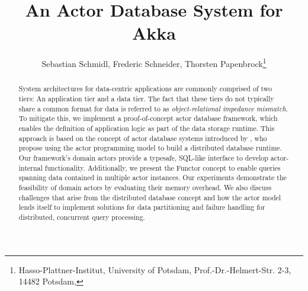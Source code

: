 \documentclass[english,utf8,biblatex]{lni-tex/lni}
\author[Frederic Schneider \and Sebastian Schmidl \and Thorsten Papenbrock]{%
Sebastian Schmidl, Frederic Schneider, Thorsten Papenbrock\footnote{Hasso-Plattner-Institut, University of Potsdam, Prof.-Dr.-Helmert-Str. 2-3, 14482 Potsdam, \email{{sebastian.schmidl,frederic.schneider,thorsten.papenbrock}@student.hpi.de}}
}
\title[An Actor Database System for Akka]{An Actor Database System for Akka}
\begin{document}
\maketitle

\setcounter{footnote}{1}

\begin{abstract}
  System architectures for data-centric applications are commonly comprised of two tiers:
  An application tier and a data tier.
  The fact that these tiers do not typically share a common format for data is referred to as \textit{object-relational impedance mismatch}.
  To mitigate this, we implement a proof-of-concept actor database framework, which enables the definition of application logic as part of the data storage runtime.
  This approach is based on the concept of actor database systems introduced by \citet{manifesto}, who propose using the actor programming model to build a distributed database runtime.
  Our framework's domain actors provide a typesafe, SQL-like interface to develop actor-internal functionality.
  Additionally, we present the Functor concept to enable queries spanning data contained in multiple actor instances.
  Our experiments demonstrate the feasibility of domain actors by evaluating their memory overhead.
  We also discuss challenges that arise from the distributed database concept and how the actor model lends itself to implement solutions for data partitioning and failure handling for distributed, concurrent query processing.
\end{abstract}




\printbibliography
\end{document}
